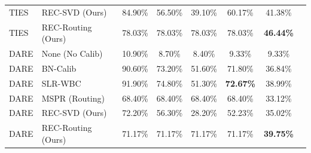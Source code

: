 \documentclass{article}
\theoremstyle{plain}
\theoremstyle{definition}
\theoremstyle{remark}
\begin{document}
\begin{table}[t]
\begin{center}
\begin{small}
\begin{sc}
\begin{tabular}{llcccccr}
TIES & REC-SVD (Ours)  & 84.90\% & 56.50\% & 39.10\% & 60.17\% & 41.38\% \\
TIES & REC-Routing (Ours) & 78.03\% & 78.03\% & 78.03\% & 78.03\% & \textbf{46.44\%} \\
\midrule
DARE & None (No Calib) & 10.90\% & 8.70\%  & 8.40\%  & 9.33\%  & 9.33\%  \\
DARE & BN-Calib        & 90.60\% & 73.20\% & 51.60\% & 71.80\% & 36.84\% \\
DARE & SLR-WBC         & 91.90\% & 74.80\% & 51.30\% & \textbf{72.67\%} & 38.99\% \\
DARE & MSPR (Routing)  & 68.40\% & 68.40\% & 68.40\% & 68.40\% & 33.12\% \\
DARE & REC-SVD (Ours)  & 72.20\% & 56.30\% & 28.20\% & 52.23\% & 35.02\% \\
DARE & REC-Routing (Ours) & 71.17\% & 71.17\% & 71.17\% & 71.17\% & \textbf{39.75\%} \\
\bottomrule
\end{tabular}
\end{sc}
\end{small}
\end{center}
\vskip -0.1in
\end{table}
\end{document}
